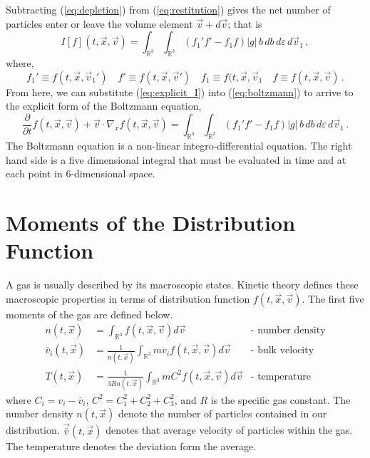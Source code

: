 \documentclass[12pt]{CSUNthesis}
\def\R{\mathbb{R}}
\def\R{\mathbb{R}}
\newcommand{\dydx}[2]{\frac{\partial{#1}}{\partial{#2}}}
\newcommand{\vecx}{\vec{x}}
\newcommand{\vecv}{\vec{v}}
\newcommand{\bulkv}{\vec{\bar{v}}} %
\begin{document}
Subtracting (\ref{eq:depletion}) from (\ref{eq:restitution}) gives the net number of particles enter or leave the volume element $\vecv + d\vecv$; that is
\begin{equation}
\label{eq:explicit_I}
I[f](t, \vecx, \vecv) = \int_{\R^3} \int_{\R^3} (f_1' f' - f_1 f) |g|\, b\, db\, d\varepsilon\, d\vecv_1\, ,
\end{equation}
where,
\begin{equation*}
f_1' \equiv f(t, \vecx, \vecv_1')\quad f' \equiv f(t, \vecx, \vecv') \quad f_1 \equiv f(t, \vecx, \vecv_1 \quad f \equiv f(t, \vecx, \vecv)\, .
\end{equation*}
From here, we can substitute (\ref{eq:explicit_I}) into (\ref{eq:boltzmann}) to arrive to the explicit form of the Boltzmann equation,
\begin{equation}
\dydx{}{t}f(t, \vecx, \vecv) + \vecv \cdot \nabla_x f(t, \vecx, \vecv) = \int_{\R^3} \int_{\R^3} (f_1' f' - f_1 f) |g|\, b\, db\, d\varepsilon\, d\vecv_1\, .
\end{equation}
The Boltzmann equation is a non-linear integro-differential equation. The right hand side is a five dimensional integral that must be evaluated in time and at each point in 6-dimensional space.

\section{Moments of the Distribution Function}

A gas is usually described by its macroscopic states. Kinetic theory defines these macroscopic properties in terms of distribution function $f(t,\vecx, \vecv)$. The first five moments of the gas are defined below.
\begin{align}
	n(t,\vec{x})&=\int_{\mathbb{R}^3}  f(t,\vec{x},\vec{v}) d\vec{v} &\text{- number density}  \label{eq:dens} \\
	\bar{v}_i(t,\vec{x})&=\frac{1}{n(t,\vec{x})} \int_{\mathbb{R}^3} m v_i f(t,\vec{x},\vec{v}) d\vec{v} &\text{- bulk velocity} \label{eq:bulk} \\
	T(t,\vec{x}) &= \frac{1}{3Rn(t,\vecx)}\int_{\mathbb{R}^3} m C^2 f(t,\vec{x},\vec{v}) d\vec{v} &\text{- temperature} \label{eq:temperature}
\end{align}
where $C_i=v_i-\bar{v}_i$, $C^2=C_1^2 + C_2^2 + C_3^2$, and $R$ is the specific gas constant. The number density $n(t, \vecx)$ denote the number of particles contained in our distribution. $\bulkv (t,\vecx)$ denotes that average velocity of particles within the gas. The temperature denotes the deviation form the average. 
\end{document}
